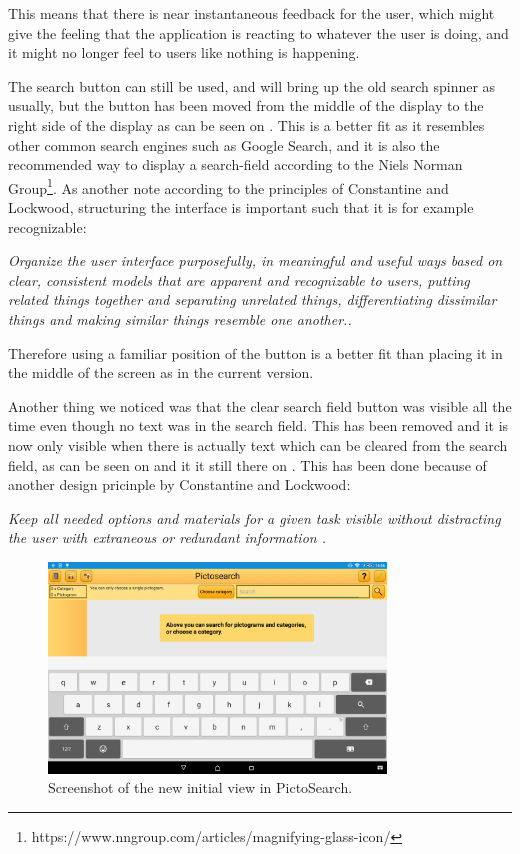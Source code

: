 This means that there is near instantaneous feedback for the user, which might give the feeling that the application is reacting to whatever the user is doing, and it might no longer feel to users like nothing is happening.

The search button can still be used, and will bring up the old search spinner as usually, but the button has been moved from the middle of the display to the right side of the display as can be seen on .
This is a better fit as it resembles other common search engines such as Google Search, and it is also the recommended way to display a search-field according to the Niels Norman Group\footnote{https://www.nngroup.com/articles/magnifying-glass-icon/}.
As another note according to the principles of Constantine and Lockwood, structuring the interface is important such that it is for example recognizable: 

\begin{displayquote}
\textit{Organize the user interface purposefully, in meaningful and useful ways based on clear, consistent models that are apparent and recognizable to users, putting related things together and separating unrelated things, differentiating dissimilar things and making similar things resemble one
another.\cite[p.~51]{DESIGNBOOK}.}
\end{displayquote}

Therefore using a familiar position of the button is a better fit than placing it in the middle of the screen as in the current version.

Another thing we noticed was that the clear search field button was visible all the time even though no text was in the search field.
This has been removed and it is now only visible when there is actually text which can be cleared from the search field, as can be seen on  and it it still there on .
This has been done because of another design pricinple by Constantine and Lockwood: 

\begin{displayquote}
\textit{Keep all needed options and materials for a given task visible without distracting the user with extraneous or redundant information \cite[p.~55]{DESIGNBOOK}.}
\end{displayquote}

\begin{figure}[h]
    \centering
    \includegraphics[width=0.8\textwidth]{figures/img/screenshots/new_startup.png}
    \caption{Screenshot of the new initial view in PictoSearch.}\label{fig:screenshot_newstartup}
\end{figure}
